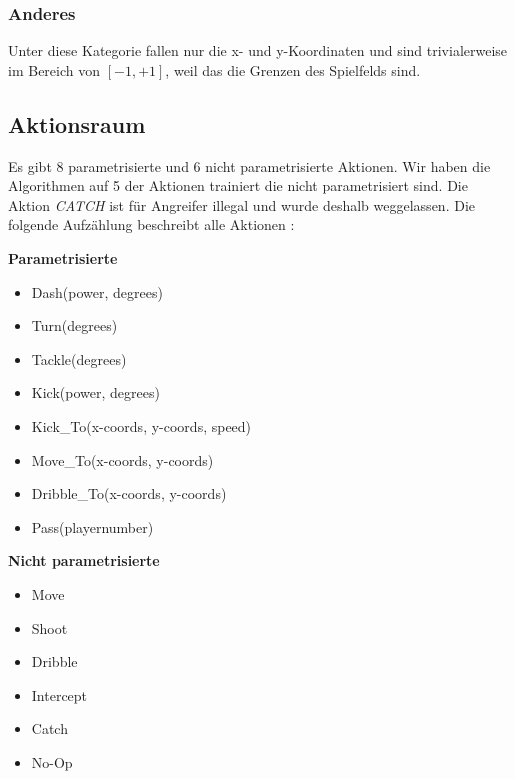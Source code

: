            \subsubsection*{Anderes}
                Unter diese Kategorie fallen nur die x- und y-Koordinaten und sind trivialerweise im Bereich von $[-1, +1]$, weil das die Grenzen des Spielfelds sind.

\newpage
        \subsection{Aktionsraum} \label{actionspace-definition}
            Es gibt 8 parametrisierte und 6 nicht parametrisierte Aktionen. Wir haben die Algorithmen auf 5 der Aktionen trainiert die nicht parametrisiert sind. Die Aktion \textit{CATCH} ist für Angreifer illegal und wurde deshalb weggelassen. Die folgende Aufzählung beschreibt alle Aktionen \cite{hfo}:

            \begin{multicols}{2}
                \textbf{Parametrisierte}
                \begin{itemize}
                    \item Dash(power, degrees)
                    \item Turn(degrees)
                    \item Tackle(degrees)
                    \item Kick(power, degrees)
                    \item Kick\_To(x-coords, y-coords, speed)
                    \item Move\_To(x-coords, y-coords)
                    \item Dribble\_To(x-coords, y-coords)
                    \item Pass(playernumber)
                \end{itemize} \par
                \textbf{Nicht parametrisierte}
                \begin{itemize}
                    \item Move
                    \item Shoot
                    \item Dribble
                    \item Intercept
                    \item Catch
                    \item No-Op
                \end{itemize}
            \end{multicols}

